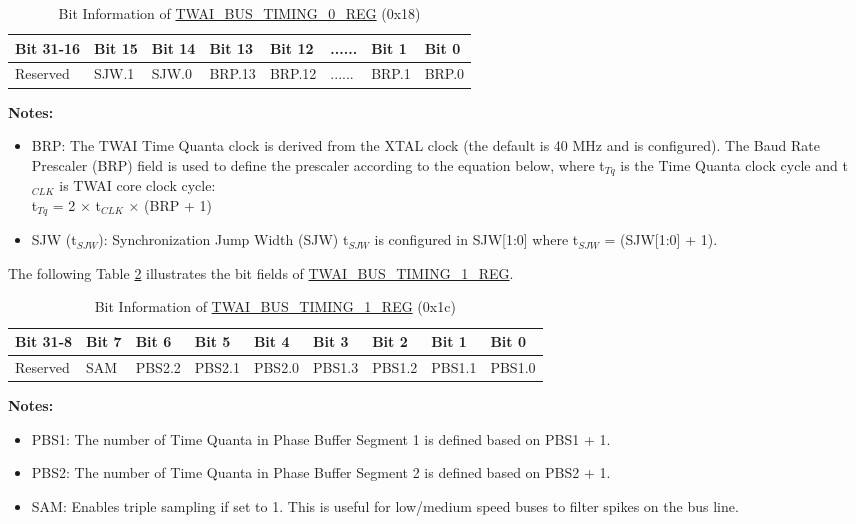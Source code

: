 \documentclass[main\_\_EN.tex]{subfiles}
\begin{document}
\begin{longtable}[c]{|p{2cm}|p{1.5cm}|p{1.5cm}|p{1.5cm}|p{1.5cm}|p{1.5cm}|p{1.5cm}|p{1.5cm}|}
\caption{Bit Information of \hyperref[regdesc:TWAIBUSTIMING0REG]{TWAI\_BUS\_TIMING\_0\_REG} (0x18)}
\label{tab:twai-bit-info-bus-timing-0-reg}\\\hline
\rowcolor{lightgray}
  \textbf{Bit 31-16} & \textbf{Bit 15} & \textbf{Bit 14} & \textbf{Bit 13} & \textbf{Bit 12} & \textbf{......} & \textbf{Bit 1} & \textbf{Bit 0}\\\hline
  Reserved& SJW.1 & SJW.0 & BRP.13 & BRP.12 & ...... & BRP.1 & BRP.0\\\hline
\end{longtable}
\vspace{-1.5em}
{\bfseries Notes:}\\
\begin{itemize}
    \item BRP: The TWAI Time Quanta clock is derived from the XTAL clock (the default is 40 MHz and is configured). The Baud Rate Prescaler (BRP) field is used to define the prescaler according to the equation below, where t$_{Tq}$ is the Time Quanta clock cycle and t$_{CLK}$ is TWAI core clock cycle:\\
    t$_{Tq}$ = 2 × t$_{CLK}$ × (BRP + 1)
    \item SJW (t$_{SJW}$): Synchronization Jump Width (SJW) t$_{SJW}$ is configured in SJW[1:0] where t$_{SJW}$ = (SJW[1:0] + 1).
\end{itemize}

The following Table \ref{tab:twai-bit-info-bus-timing-1-reg} illustrates the bit fields of \hyperref[regdesc:TWAIBUSTIMING1REG]{TWAI\_BUS\_TIMING\_1\_REG}.

\clearpage
\begin{longtable}[c]{|p{1.4cm}|p{1.4cm}|p{1.4cm}|p{1.4cm}|p{1.4cm}|p{1.4cm}|p{1.4cm}|p{1.4cm}|p{1.4cm}|}
    \caption{Bit Information of \hyperref[regdesc:TWAIBUSTIMING1REG]{TWAI\_BUS\_TIMING\_1\_REG} (0x1c)}
    \label{tab:twai-bit-info-bus-timing-1-reg}\\
    \hline
       \rowcolor{lightgray}
   \textbf{Bit 31-8} & \textbf{Bit 7} & \textbf{Bit 6} & \textbf{Bit 5} & \textbf{Bit 4} & \textbf{Bit 3} & \textbf{Bit 2} & \textbf{Bit 1} & \textbf{Bit 0}\\\hline
   Reserved & SAM & PBS2.2 & PBS2.1 & PBS2.0 & PBS1.3 &PBS1.2 & PBS1.1 & PBS1.0\\
    \hline
\end{longtable}
\vspace{-1.5em}
{\bfseries Notes:}\\
\begin{itemize}
    \item PBS1: The number of Time Quanta in Phase Buffer Segment 1 is defined based on PBS1 + 1.
    \item PBS2: The number of Time Quanta in Phase Buffer Segment 2 is defined based on PBS2 + 1.
    \item SAM: Enables triple sampling if set to 1. This is useful for low/medium speed buses to filter spikes on the bus line.
\end{itemize}
\end{document}
